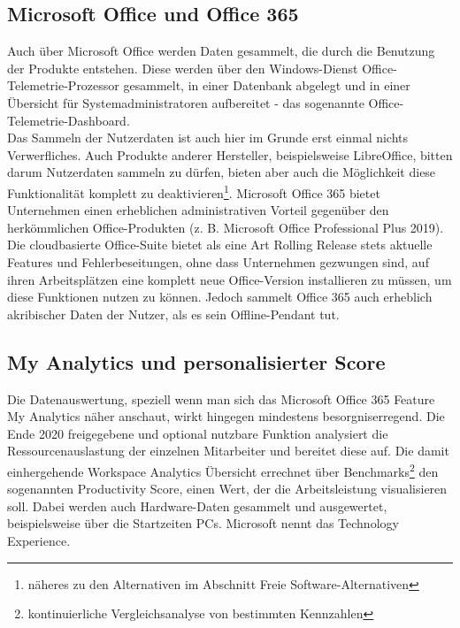 \subsection{Microsoft Office und Office 365}
Auch über Microsoft Office werden Daten gesammelt, die durch die Benutzung der Produkte entstehen. Diese werden über den Windows-Dienst \glqq Office-Telemetrie-Prozessor\grqq{} gesammelt, in einer Datenbank abgelegt und in einer Übersicht für Systemadministratoren aufbereitet - das sogenannte \glqq Office-Telemetrie-Dashboard\grqq{}.\\
Das Sammeln der Nutzerdaten ist auch hier im Grunde erst einmal nichts Verwerfliches. Auch Produkte anderer Hersteller, beispielsweise LibreOffice, bitten darum Nutzerdaten sammeln zu dürfen, bieten aber auch die Möglichkeit diese Funktionalität komplett zu deaktivieren\footnote{näheres zu den Alternativen im Abschnitt \glqq Freie Software-Alternativen\grqq{}}. Microsoft Office 365 bietet Unternehmen einen erheblichen administrativen Vorteil gegenüber den herkömmlichen Office-Produkten (z. B. Microsoft Office Professional Plus 2019). Die cloudbasierte Office-Suite bietet als eine Art \glqq Rolling Release\grqq{} stets aktuelle Features und Fehlerbeseitungen, ohne dass Unternehmen gezwungen sind, auf ihren Arbeitsplätzen eine komplett neue Office-Version installieren zu müssen, um diese Funktionen nutzen zu können. Jedoch sammelt Office 365 auch erheblich akribischer Daten der Nutzer, als es sein \glqq Offline\grqq{}-Pendant tut.

\subsection{My Analytics und personalisierter Score}
Die Datenauswertung, speziell wenn man sich das Microsoft Office 365 Feature \glqq My Analytics\grqq{} näher anschaut, wirkt hingegen mindestens besorgniserregend. Die Ende 2020 freigegebene und optional nutzbare Funktion analysiert die Ressourcenauslastung der einzelnen Mitarbeiter und bereitet diese auf. Die damit einhergehende \glqq Workspace Analytics\grqq{} Übersicht errechnet über Benchmarks\footnote{kontinuierliche Vergleichsanalyse von bestimmten Kennzahlen} den sogenannten \glqq Productivity Score\grqq{}, einen Wert, der die Arbeitsleistung visualisieren soll. Dabei werden auch Hardware-Daten gesammelt und ausgewertet, beispielsweise über die Startzeiten PCs. Microsoft nennt das \glqq Technology Experience\grqq{}.\\

